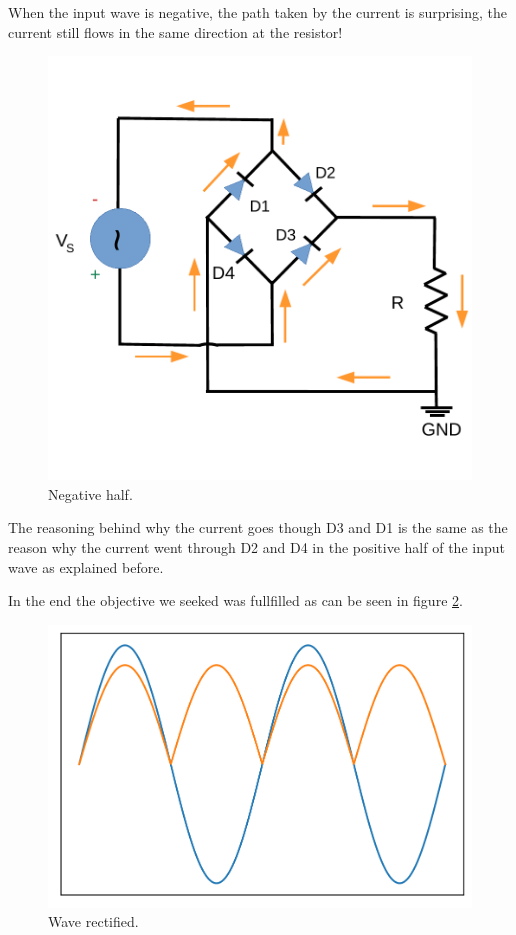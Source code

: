 When the input wave is negative, the path taken by the current is surprising, the current still flows in the same direction at the resistor!
\begin{figure}[h] \centering
    \includegraphics[scale=0.4]{lab3 _negative.pdf}
    \caption{Negative half.}
    \label{fig:rc3}
\end{figure}

The reasoning behind why the current goes though D3 and D1 is the same as
the reason why the current went through D2 and D4 in the positive half of the input wave as explained before.

In the end the objective we seeked was fullfilled as can be seen in figure \ref{fig:rc4}.
\begin{figure}[h] \centering
    \includegraphics[scale=0.75]{rectwave.png}
    \caption{Wave rectified.}
    \label{fig:rc4}
\end{figure}

